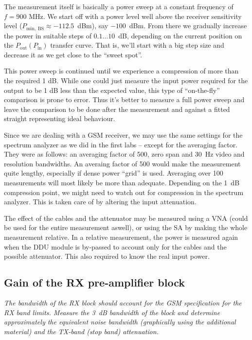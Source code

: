 \documentclass[a4paper, 12pt]{article}
\begin{document}
The measurement itself is basically a power sweep at a constant frequency of 
$f = 900$ MHz. We start off with a power level well above the receiver sensitivity 
level ($P_\mathrm{min,\;BS} \approx -112.5$~dBm), say $-100$~dBm. From there we 
gradually increase the power in suitable steps of $0.1 \ldots 10$~dB, depending on 
the current position on the $P_\mathrm{out}(P_\mathrm{in})$ transfer curve. That 
is, we'll start with a big step size and decrease it as we get close to the 
``sweet spot''. 

This power sweep is continued until we experience a compression of more than the 
required 1 dB. While one could just measure the input power required for the output 
to be 1 dB less than the expected value, this type of ``on-the-fly'' comparison 
is prone to error. Thus it's better to measure a full power sweep and leave the 
comparison to be done after the measurement and against a fitted straight representing 
ideal behaviour.

Since we are dealing with a GSM receiver, we may use the same settings for the 
spectrum analyzer as we did in the first labs -- except for the averaging factor. 
They were as follows: an averaging factor of 500, zero span and 30~Hz video and 
resolution bandwidths. An averaing factor of 500 would make the measurement quite 
lengthy, especially if dense power ``grid'' is used. Averaging over 100 measurements 
will most likely be more than adequate. Depending on the 1~dB compression point, 
we might need to watch out for compression in the spectrum analyzer. This is taken 
care of by altering the input attenuation.

The effect of the cables and the attenuator may be measured using a VNA (could be used 
for the entire measurement aswell), or using the SA by making the whole measurement 
relative. In a relative measurement, the power is measured again when the DDU module 
is by-passed to account only for the cables and the possible attenuator. This also 
required to know the real input power. 


\subsection{Gain of the RX pre-amplifier block}

\textit{The bandwidth of the RX block should account for the GSM specification 
for the RX band limits. Measure the 3~dB bandwidth of the block and determine 
approximately the equivalent noise bandwidth (graphically using the additional 
material) and the TX-band (stop band) attenuation.}
\end{document}
